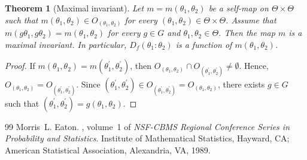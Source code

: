 \documentclass[10pt,a4paper]{amsart}
\newtheorem{Thm}{Theorem}[section]
\begin{document}
\begin{Thm}[Maximal invariant]\label{thm:abstract}
Let $m = m(\theta_1, \theta_2)$ be a self-map on $\Theta \times \Theta$ such that 
$m(\theta_1, \theta_2) \in O_{(\theta_1, \theta_2)}$ for every $(\theta_1, \theta_2) \in \Theta \times \Theta$. 
Assume that $m(g\theta_1, g\theta_2) = m(\theta_1, \theta_2)$ for every $g \in G$ and $\theta_1, \theta_2 \in \Theta$. 
Then the map $m$ is a maximal invariant. 
In particular, 
$D_f (\theta_1 \colon \theta_2) $ is a function of $m(\theta_1, \theta_2)$. 
\end{Thm}

\begin{proof}
If $m(\theta_1, \theta_2) = m(\theta_1^{\prime}, \theta_2^{\prime})$, then 
$O_{(\theta_1, \theta_2)} \cap O_{(\theta_1^{\prime}, \theta_2^{\prime})} \ne \emptyset$. 
Hence, 
$O_{(\theta_1, \theta_2)} = O_{(\theta_1^{\prime}, \theta_2^{\prime})}$. 
Since $(\theta_1^{\prime}, \theta_2^{\prime}) \in  O_{(\theta_1^{\prime}, \theta_2^{\prime})} = O_{(\theta_1, \theta_2)}$, 
there exists $g \in G$ such that $(\theta_1^{\prime}, \theta_2^{\prime}) = g(\theta_1, \theta_2)$. 
\end{proof}


\begin{thebibliography}{99}
 Morris~L. Eaton. , volume~1 of {\em NSF-CBMS Regional Conference Series in Probability and Statistics}. \newblock Institute of Mathematical Statistics, Hayward, CA; American Statistical Association, Alexandria, VA, 1989.
\end{thebibliography}
\end{document}
